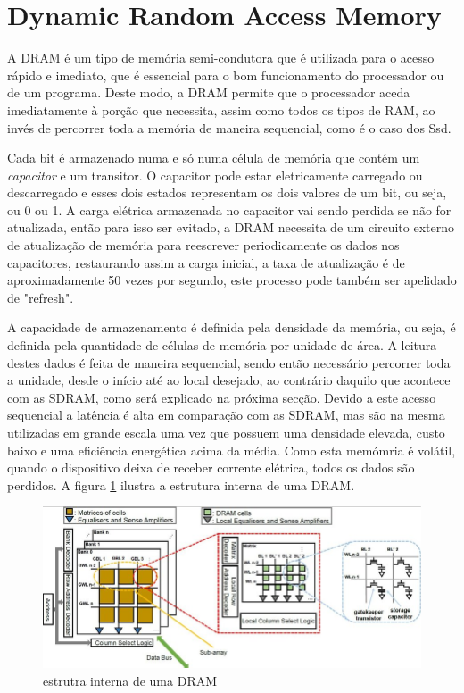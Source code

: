 \documentclass{report}
\begin{document}
\section{Dynamic Random Access Memory} 
\par A \ac{DRAM} é um tipo de memória semi-condutora que é utilizada para o acesso rápido e imediato, que é essencial para o bom funcionamento do processador ou de um programa. Deste modo, a \ac{DRAM} permite que o processador aceda imediatamente à porção que necessita, assim como todos os tipos de \ac{RAM}, ao invés de percorrer toda a memória de maneira sequencial, como é o caso dos \ac{Ssd}.
\par Cada bit é armazenado numa e só numa célula de memória que contém um  \textit{capacitor} e um transitor. O capacitor pode estar eletricamente carregado ou descarregado e esses dois estados representam os dois valores de um bit, ou seja, ou 0 ou 1. A carga elétrica armazenada no capacitor vai sendo perdida se não for atualizada, então para isso ser evitado, a \ac{DRAM} necessita de um circuito externo de atualização de memória para reescrever periodicamente os dados nos capacitores, restaurando assim a carga inicial, a taxa de atualização é de aproximadamente 50 vezes por segundo, este processo pode também ser apelidado de "refresh".
\par A capacidade de armazenamento é definida pela densidade da memória, ou seja, é definida pela quantidade de células de memória por unidade de área. A leitura destes dados é feita de maneira sequencial, sendo então necessário percorrer toda a unidade, desde o início até ao local desejado, ao contrário daquilo que acontece com as \ac{SDRAM}, como será explicado na próxima secção. Devido a este acesso sequencial a latência é alta em comparação com as \ac{SDRAM}, mas são na mesma utilizadas em grande escala uma vez que possuem uma densidade elevada, custo baixo e uma eficiência energética acima da média.
Como esta memómria é volátil, quando o dispositivo deixa de receber corrente elétrica, todos os dados são perdidos. A figura \ref{imagem dram} ilustra a estrutura interna de uma \ac{DRAM}.
\begin{figure}[h]
\includegraphics[scale=0.5]{estruturadram.png}
\centering
\caption{estrutra interna de uma \ac{DRAM}}
\label{imagem dram}
\end{figure}
\pagebreak
\end{document}
